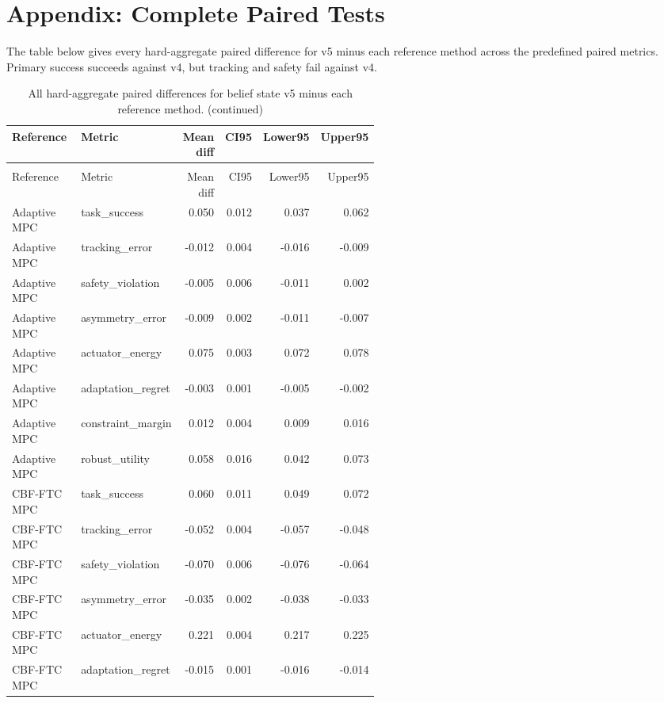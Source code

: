 \documentclass{article}
\begin{document}
\section{Appendix: Complete Paired Tests}
The table below gives every hard-aggregate paired difference for v5 minus each reference method across the predefined paired metrics. Primary success succeeds against v4, but tracking and safety fail against v4.
\begin{center}
\tiny
\begin{longtable}{p{0.31\linewidth}p{0.23\linewidth}rrrr}
\caption{All hard-aggregate paired differences for belief state v5 minus each reference method.}\label{tab:full-pairwise}\\
\toprule
Reference & Metric & Mean diff & CI95 & Lower95 & Upper95\\
\midrule
\endfirsthead
\caption[]{All hard-aggregate paired differences for belief state v5 minus each reference method. (continued)}\\
\toprule
Reference & Metric & Mean diff & CI95 & Lower95 & Upper95\\
\midrule
\endhead
Adaptive MPC & task\_success & 0.050 & 0.012 & 0.037 & 0.062\\
Adaptive MPC & tracking\_error & -0.012 & 0.004 & -0.016 & -0.009\\
Adaptive MPC & safety\_violation & -0.005 & 0.006 & -0.011 & 0.002\\
Adaptive MPC & asymmetry\_error & -0.009 & 0.002 & -0.011 & -0.007\\
Adaptive MPC & actuator\_energy & 0.075 & 0.003 & 0.072 & 0.078\\
Adaptive MPC & adaptation\_regret & -0.003 & 0.001 & -0.005 & -0.002\\
Adaptive MPC & constraint\_margin & 0.012 & 0.004 & 0.009 & 0.016\\
Adaptive MPC & robust\_utility & 0.058 & 0.016 & 0.042 & 0.073\\
CBF-FTC MPC & task\_success & 0.060 & 0.011 & 0.049 & 0.072\\
CBF-FTC MPC & tracking\_error & -0.052 & 0.004 & -0.057 & -0.048\\
CBF-FTC MPC & safety\_violation & -0.070 & 0.006 & -0.076 & -0.064\\
CBF-FTC MPC & asymmetry\_error & -0.035 & 0.002 & -0.038 & -0.033\\
CBF-FTC MPC & actuator\_energy & 0.221 & 0.004 & 0.217 & 0.225\\
CBF-FTC MPC & adaptation\_regret & -0.015 & 0.001 & -0.016 & -0.014\\

\end{longtable}
\end{center}
\end{document}
